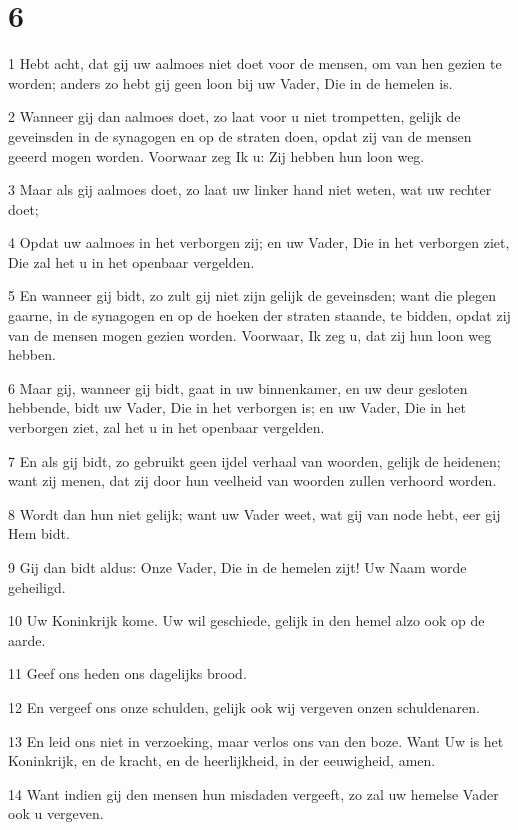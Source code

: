\chapter{6}

\par 1 Hebt acht, dat gij uw aalmoes niet doet voor de mensen, om van hen gezien te worden; anders zo hebt gij geen loon bij uw Vader, Die in de hemelen is.
\par 2 Wanneer gij dan aalmoes doet, zo laat voor u niet trompetten, gelijk de geveinsden in de synagogen en op de straten doen, opdat zij van de mensen geeerd mogen worden. Voorwaar zeg Ik u: Zij hebben hun loon weg.
\par 3 Maar als gij aalmoes doet, zo laat uw linker hand niet weten, wat uw rechter doet;
\par 4 Opdat uw aalmoes in het verborgen zij; en uw Vader, Die in het verborgen ziet, Die zal het u in het openbaar vergelden.
\par 5 En wanneer gij bidt, zo zult gij niet zijn gelijk de geveinsden; want die plegen gaarne, in de synagogen en op de hoeken der straten staande, te bidden, opdat zij van de mensen mogen gezien worden. Voorwaar, Ik zeg u, dat zij hun loon weg hebben.
\par 6 Maar gij, wanneer gij bidt, gaat in uw binnenkamer, en uw deur gesloten hebbende, bidt uw Vader, Die in het verborgen is; en uw Vader, Die in het verborgen ziet, zal het u in het openbaar vergelden.
\par 7 En als gij bidt, zo gebruikt geen ijdel verhaal van woorden, gelijk de heidenen; want zij menen, dat zij door hun veelheid van woorden zullen verhoord worden.
\par 8 Wordt dan hun niet gelijk; want uw Vader weet, wat gij van node hebt, eer gij Hem bidt.
\par 9 Gij dan bidt aldus: Onze Vader, Die in de hemelen zijt! Uw Naam worde geheiligd.
\par 10 Uw Koninkrijk kome. Uw wil geschiede, gelijk in den hemel alzo ook op de aarde.
\par 11 Geef ons heden ons dagelijks brood.
\par 12 En vergeef ons onze schulden, gelijk ook wij vergeven onzen schuldenaren.
\par 13 En leid ons niet in verzoeking, maar verlos ons van den boze. Want Uw is het Koninkrijk, en de kracht, en de heerlijkheid, in der eeuwigheid, amen.
\par 14 Want indien gij den mensen hun misdaden vergeeft, zo zal uw hemelse Vader ook u vergeven.
